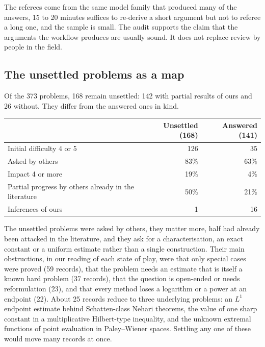 \documentclass[11pt]{amsart}
\begin{document}
The referees come from the same model family that produced many of the answers,
15 to 20 minutes suffices to re-derive a short argument but not to referee a
long one, and the sample is small. The audit supports the claim that the
arguments the workflow produces are usually sound. It does not replace review
by people in the field.

\subsection{The unsettled problems as a map}
Of the 373 problems, 168 remain unsettled: 142 with partial results of ours and
26 without. They differ from the answered ones in kind.
\begin{center}
  \begin{tabular}{lrr}
    \toprule
                                                         & Unsettled (168) & Answered (141) \\
    \midrule
    Initial difficulty 4 or 5                            & 126             & 35             \\
    Asked by others                                      & 83\%            & 63\%           \\
    Impact 4 or more                                     & 19\%            & 4\%            \\
    Partial progress by others already in the literature & 50\%            & 21\%           \\
    Inferences of ours                                   & 1               & 16             \\
    \bottomrule
  \end{tabular}
\end{center}
The unsettled problems were asked by others, they matter more, half had already
been attacked in the literature, and they ask for a characterisation, an exact
constant or a uniform estimate rather than a single construction. Their main
obstructions, in our reading of each state of play, were that only special
cases were proved (59 records), that the problem needs an estimate that is
itself a known hard problem (37 records), that the question is open-ended or
needs reformulation (23), and that every method loses a logarithm or a power at
an endpoint (22). About 25 records reduce to three underlying problems: an
$L^1$ endpoint estimate behind Schatten-class Nehari theorems, the value of one
sharp constant in a multiplicative Hilbert-type inequality, and the unknown
extremal functions of point evaluation in Paley--Wiener spaces. Settling any
one of these would move many records at once.
\end{document}
